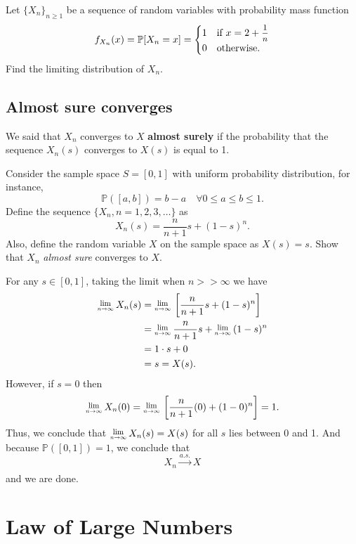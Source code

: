 \begin{example}
    Let $\{X_n \}_{n \geq 1}$ be a sequence of random variables with probability mass function 
    \[
        f_{X_n}(x) = \mathbb{P}[X_n = x] = \begin{cases}
            1 & \text{if } x = 2 + \mfrac{1}{n}\\
            0 & \text{otherwise}.
        \end{cases}
    \]
    Find the limiting distribution of $X_n$.
\end{example}

\subsection{Almost sure converges}

We said that $X_n$ converges to $X$ \textbf{almost surely} if the probability that the sequence $X_n(s)$ 
converges to $X(s)$ is equal to 1.

\begin{example}
    Consider the sample space $S = [0,1]$ with uniform probability distribution, for instance,
    \[
        \mathbb{P}([a,b]) = b - a \quad \forall 0 \leq a \leq b \leq 1.
    \]
    Define the sequence $\{X_n, n=1,2,3,\ldots\}$ as 
    \[
        X_n(s) = \frac{n}{n+1}s + (1-s)^n.
    \]
    Also, define the random variable $X$ on the sample space as $X(s) = s$. Show that $X_n$ 
    \textit{almost sure} converges to $X$.
\end{example}
\begin{solution}
    For any $s \in [0,1]$, taking the limit when $n >> \infty$ we have 
    \begin{align*}
        \Lim{n \to \infty}X_n(s) &= \Lim{n \to \infty} \left[ \frac{n}{n+1}s + (1 - s)^n \right]\\
        &= \Lim{n \to \infty} \frac{n}{n+1}s + \Lim{n \to \infty} (1 - s)^n\\
        &= 1\cdot s + 0\\
        &= s = X(s).
    \end{align*}
    However, if $s=0$ then 
    \[
        \Lim{n \to \infty}X_n(0) = \Lim{n \to \infty} \left[ \frac{n}{n+1}(0) + (1-0)^n\right] = 1.
    \]
    Thus, we conclude that $\Lim{n \to \infty} X_n(s) = X(s)$ for all $s$ lies between 0 and 1.
    And because $\mathbb{P}([0,1]) = 1$, we conclude that
    \[
        X_n \xrightarrow[]{a.s.} X
    \]
    and we are done.
\end{solution}

\section{Law of Large Numbers}


